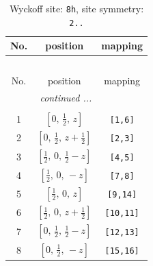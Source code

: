 \documentclass[fleqn,8pt]{jsarticle}
\begin{document}
\begin{longtable}{ccc}
\caption{Wyckoff site: {\tt 8h}, site symmetry: {\tt 2..}}
 \\
 \hline \hline
No. & position & mapping \\ \hline \endfirsthead

\multicolumn{2}{l}{\tablename\ \thetable{}} \\
 \hline \hline
No. & position & mapping \\ \hline \endhead

 \hline \hline
\multicolumn{2}{r}{\footnotesize\it continued ...} \\ \endfoot

 \hline \hline
\multicolumn{2}{r}{} \\ \endlastfoot

1 & $\left[ 0,\, \frac{1}{2},\, z \right]$ & {\tt [1,6]} \\ \hline
2 & $\left[ 0,\, \frac{1}{2},\, z + \frac{1}{2} \right]$ & {\tt [2,3]} \\ \hline
3 & $\left[ \frac{1}{2},\, 0,\, \frac{1}{2} - z \right]$ & {\tt [4,5]} \\ \hline
4 & $\left[ \frac{1}{2},\, 0,\, - z \right]$ & {\tt [7,8]} \\ \hline
5 & $\left[ \frac{1}{2},\, 0,\, z \right]$ & {\tt [9,14]} \\ \hline
6 & $\left[ \frac{1}{2},\, 0,\, z + \frac{1}{2} \right]$ & {\tt [10,11]} \\ \hline
7 & $\left[ 0,\, \frac{1}{2},\, \frac{1}{2} - z \right]$ & {\tt [12,13]} \\ \hline
8 & $\left[ 0,\, \frac{1}{2},\, - z \right]$ & {\tt [15,16]} \\
\end{longtable}
\renewcommand{\arraystretch}{1.2}
\end{document}
